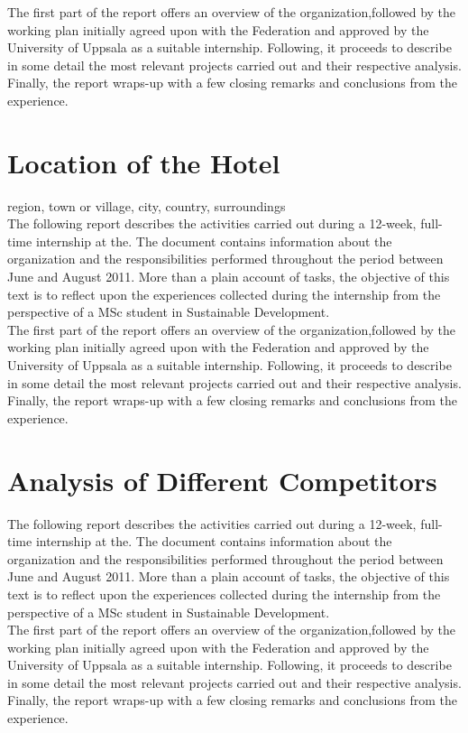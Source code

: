 \documentclass[12pt,onecolumn]{IEEEtran}
\begin{document}
The first part of the report offers an overview of the organization,followed by the working plan initially agreed upon with the Federation and approved by the University of Uppsala as a suitable internship. Following, it proceeds to describe in some detail the most relevant projects carried out and their respective analysis. Finally, the report
wraps-up with a few closing remarks and conclusions from the experience.

\newpage
\section{\textbf{Location of the Hotel}}
 region, town or village, city, country, surroundings\\
 
The following report describes the activities carried out during a 12-week, full-time internship at the. The document contains information about the organization and the responsibilities performed throughout the period between June and August 2011. More than a plain account of tasks, the objective of this text is to reflect upon the experiences collected during the internship from the perspective of a MSc student in
Sustainable Development.\\

The first part of the report offers an overview of the organization,followed by the working plan initially agreed upon with the Federation and approved by the University of Uppsala as a suitable internship. Following, it proceeds to describe in some detail the most relevant projects carried out and their respective analysis. Finally, the report
wraps-up with a few closing remarks and conclusions from the experience.

\newpage
\section{\textbf{Analysis of Different Competitors}}
The following report describes the activities carried out during a 12-week, full-time internship at the. The document contains information about the organization and the responsibilities performed throughout the period between June and August 2011. More than a plain account of tasks, the objective of this text is to reflect upon the experiences collected during the internship from the perspective of a MSc student in
Sustainable Development.\\

The first part of the report offers an overview of the organization,followed by the working plan initially agreed upon with the Federation and approved by the University of Uppsala as a suitable internship. Following, it proceeds to describe in some detail the most relevant projects carried out and their respective analysis. Finally, the report
wraps-up with a few closing remarks and conclusions from the experience.
\end{document}
